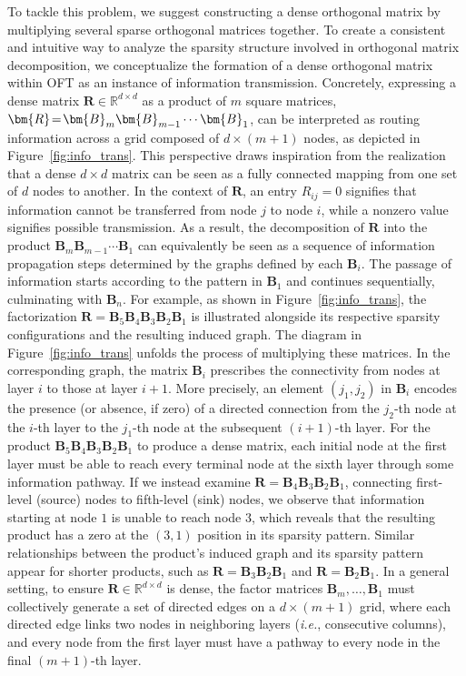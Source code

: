 To tackle this problem, we suggest constructing a dense orthogonal matrix by multiplying several sparse orthogonal matrices together. To create a consistent and intuitive way to analyze the sparsity structure involved in orthogonal matrix decomposition, we conceptualize the formation of a dense orthogonal matrix within OFT as an instance of information transmission. Concretely, expressing a dense matrix $\bm{R}\in\mathbb{R}^{d\times d}$ as a product of $m$ square matrices, $\thickmuskip=2mu \medmuskip=2mu \bm{R} = \bm{B}_m\bm{B}_{m-1}\cdots\bm{B}_1$, can be interpreted as routing information across a grid composed of $d\times (m+1)$ nodes, as depicted in Figure~\ref{fig:info_trans}. This perspective draws inspiration from the realization that a dense $d \times d$ matrix can be seen as a fully connected mapping from one set of $d$ nodes to another. In the context of $\bm{R}$, an entry $R_{ij}=0$ signifies that information cannot be transferred from node $j$ to node $i$, while a nonzero value signifies possible transmission. As a result, the decomposition of $\bm{R}$ into the product $\bm{B}_m\bm{B}_{m-1}\cdots\bm{B}_1$ can equivalently be seen as a sequence of information propagation steps determined by the graphs defined by each $\bm{B}_i$. The passage of information starts according to the pattern in $\bm{B}_1$ and continues sequentially, culminating with $\bm{B}_n$. For example, as shown in Figure~\ref{fig:info_trans}, the factorization $\bm{R} = \bm{B}_5\bm{B}_4\bm{B}_3\bm{B}_2\bm{B}_1$ is illustrated alongside its respective sparsity configurations and the resulting induced graph. The diagram in Figure~\ref{fig:info_trans} unfolds the process of multiplying these matrices. In the corresponding graph, the matrix $\bm{B}_i$ prescribes the connectivity from nodes at layer $i$ to those at layer $i+1$. More precisely, an element $(j_1,j_2)$ in $\bm{B}_i$ encodes the presence (or absence, if zero) of a directed connection from the $j_2$-th node at the $i$-th layer to the $j_1$-th node at the subsequent $(i+1)$-th layer. For the product $\bm{B}_5\bm{B}_4\bm{B}_3\bm{B}_2\bm{B}_1$ to produce a dense matrix, each initial node at the first layer must be able to reach every terminal node at the sixth layer through some information pathway. If we instead examine $\bm{R}=\bm{B}_4\bm{B}_3\bm{B}_2\bm{B}_1$, connecting first-level (source) nodes to fifth-level (sink) nodes, we observe that information starting at node $1$ is unable to reach node $3$, which reveals that the resulting product has a zero at the $(3,1)$ position in its sparsity pattern. Similar relationships between the product’s induced graph and its sparsity pattern appear for shorter products, such as $\bm{R}=\bm{B}_3\bm{B}_2\bm{B}_1$ and $\bm{R}=\bm{B}_2\bm{B}_1$. In a general setting, to ensure $\bm{R}\in\mathbb{R}^{d\times d}$ is dense, the factor matrices $\bm{B}_m,\ldots,\bm{B}_1$ must collectively generate a set of directed edges on a $d\times(m+1)$ grid, where each directed edge links two nodes in neighboring layers (\emph{i.e.}, consecutive columns), and every node from the first layer must have a pathway to every node in the final $(m+1)$-th layer.

